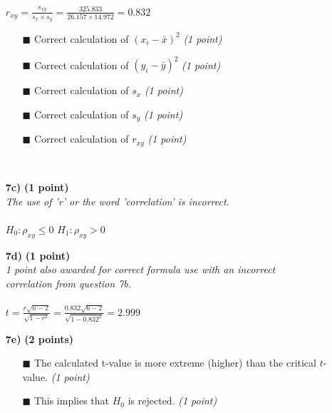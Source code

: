 \begin{itemize}
$r_{xy} = \frac{s_{xy}}{s_x \times s_y} = \frac{325.833}{26.157 \times 14.972} = 0.832$ \\ 
        \begin{itemize}
        \item[$\blacksquare$] Correct calculation of $(x_i - \bar{x})^2$ \hspace{1cm} \textit{(1 point)}
        \item[$\blacksquare$] Correct calculation of $(y_i - \bar{y})^2$ \hspace{1cm} \textit{(1 point)}
        \item[$\blacksquare$] Correct calculation of $s_x$ \hspace{2.1cm} \textit{(1 point)}
        \item[$\blacksquare$] Correct calculation of $s_y$ \hspace{2.1cm} \textit{(1 point)}
        \item[$\blacksquare$] Correct calculation of $r_{xy}$ \hspace{2cm} \textit{(1 point)}
    \end{itemize} \\
\item[\textbf{7c)}] \textbf{(1 point)} \\
\textit{The use of 'r' or the word 'correlation' is incorrect.} \\ \\ 
$H_0: \rho_{xy} \leq 0$ \hspace{3cm} $H_1: \rho_{xy} > 0$ \\
\item[\textbf{7d)}] \textbf{(1 point)} \\
\textit{1 point also awarded for correct formula use with an incorrect \\correlation from question 7b.} \\ \\ 
$t = \frac{r \sqrt{n - 2}}{\sqrt{1 - r^2}} = \frac{0.832 \sqrt{6 - 2}}{\sqrt{1 - 0.832^2}} = 2.999$ \\
\item[\textbf{7e)}] \textbf{(2 points)} \\
        \begin{itemize}
        \item[$\blacksquare$] The calculated t-value is more extreme (higher) than the critical $t$-value. \textit{(1 point)}
        \item[$\blacksquare$] This implies that $H_0$ is rejected. \textit{(1 point)}
        \end{itemize}
\end{itemize}

\normalfont

\clearpage %